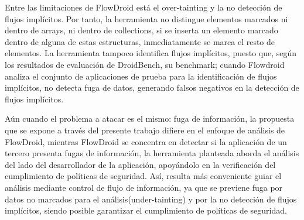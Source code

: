 Entre las limitaciones de FlowDroid está el over-tainting y la no detección
de flujos implícitos. Por tanto, la herramienta no distingue elementos marcados
ni dentro de arrays, ni dentro de collections, si se inserta un elemento marcado
dentro de alguna de estas estructuras, inmediatamente se marca el resto de
elementos. La herramienta tampoco identifica flujos implícitos,    
puesto que, según los resultados de evaluación de
DroidBench\cite{DroidBenchBenchmarks}, su benchmark; cuando Flowdroid analiza el
conjunto de aplicaciones de prueba para la identificación de flujos implícitos, no
detecta fuga de datos, generando falsos negativos en la detección de flujos
implícitos\cite[pags 32-36]{FlowDroid-Thesis}.\newline

Aún cuando el problema a atacar es el mismo: fuga de información, la propuesta
que se expone a través del presente trabajo difiere en el enfoque de análisis de
FlowDroid, mientras FlowDroid se concentra en detectar si la aplicación de un
tercero presenta fugas de información, la herramienta planteada aborda el
análisis del lado del desarrollador de la aplicación, apoyándolo en
la verificación del cumplimiento de políticas de seguridad. Así, resulta más
conveniente guiar el análisis mediante control de flujo de información, ya que
se previene fuga por datos no marcados para el análisis(under-tainting) y por
la no detección de flujos implícitos, siendo posible garantizar el cumplimiento
de políticas de seguridad.
 

